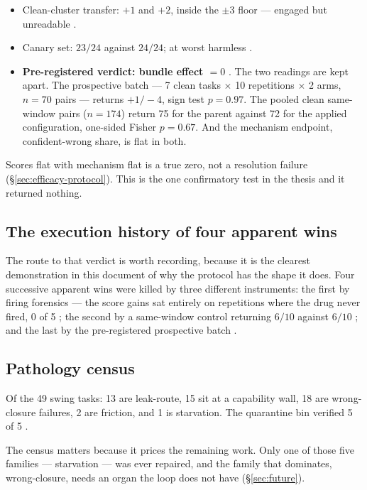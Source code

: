\begin{itemize}
  \item Clean-cluster transfer: $+1$ and $+2$, inside the $\pm3$ floor ---
        engaged but unreadable .
  \item Canary set: $23/24$ against $24/24$; at worst harmless .
  \item \textbf{Pre-registered verdict: bundle effect $= 0$} . The
        two readings are kept apart. The prospective batch --- 7 clean
        tasks $\times$ 10 repetitions $\times$ 2 arms, $n{=}70$ pairs ---
        returns $+1/-4$, sign test $p = 0.97$. The pooled clean
        same-window pairs ($n{=}174$) return 75 for the parent against 72
        for the applied configuration, one-sided Fisher $p = 0.67$. And
        the mechanism endpoint, confident-wrong share, is flat in both.
\end{itemize}

Scores flat with mechanism flat is a true zero, not a resolution failure
(\S\ref{sec:efficacy-protocol}). This is the one confirmatory test in the
thesis and it returned nothing.

\subsection*{The execution history of four apparent wins}

The route to that verdict is worth recording, because it is the clearest
demonstration in this document of why the protocol has the shape it does.
Four successive apparent wins were killed by three different instruments:
the first by firing forensics --- the score gains sat entirely on
repetitions where the drug never fired, 0 of 5 ; the second by a
same-window control returning $6/10$ against $6/10$ ; and the last by
the pre-registered prospective batch .

\subsection*{Pathology census}

Of the 49 swing tasks: 13 are leak-route, 15 sit at a capability wall, 18
are wrong-closure failures, 2 are friction, and 1 is starvation. The
quarantine bin verified 5 of 5 .

The census matters because it prices the remaining work. Only one of those
five families --- starvation --- was ever repaired, and the family that
dominates, wrong-closure, needs an organ the loop does not have
(\S\ref{sec:future}).

